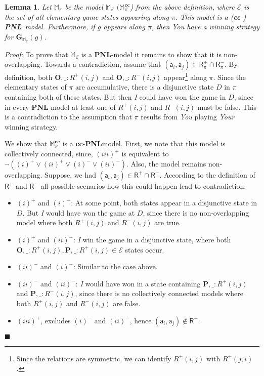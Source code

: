 \documentclass{easychair}
\newcommand{\I}{\emph{I}\xspace}
\newcommand{\You}{\emph{You}\xspace}
\newcommand{\Your}{\emph{Your}\xspace}
\newcommand{\M}{\mathbb{M}}
\newcommand{\R}{\mathsf{R}}
\newcommand{\ag}{\mathsf{a}}
\renewcommand{\qed}{\hfill$\blacksquare$}
\newtheorem{lemma}{Lemma}
\renewenvironment{proof}{\noindent\textit{Proof:}\quad}{\qed}
\newcommand{\PNL}{\textbf{PNL}}
\newcommand{\cc}{\textbf{cc}}
\begin{document}
\begin{lemma}\label{lemmamodel}
Let $\M_\pi$ be the model $\M_\mathcal{E}$ $(\M_\mathcal{E}^\cc$) from the above definition, where $\mathcal{E}$ is the set of all elementary game states appearing along $\pi$. This model is a (\cc-) \PNL~model. Furthermore, if $g$ appears along $\pi$, then \You have a winning strategy for $\mathbf{G}_{\M_\pi}(g)$.
\end{lemma}

\begin{proof}
To prove that $\M_\mathcal{E}$ is a \PNL-model it remains to show that it is non-overlapping. Towards a contradiction, assume that $(\ag_i,\ag_j)\in \R_\pi^+\cap \R_\pi^-$. By definition, both $\mathbf{O},\_:R^+(i,j)$ and $\mathbf{O},\_:R^-(i,j)$ appear\footnote{Since the relations are symmetric, we can identify $R^\pm(i,j)$ with $R^\pm(j,i)$.} along $\pi$. Since the elementary states of $\pi$
are accumulative, there is a disjunctive state $D$ in $\pi$ containing both of these states. But then \I could have won the game in $D$, since in every \PNL-model at least one of $R^+(i,j)$ and $R^-(i,j)$ must be false. This is a contradiction to the assumption that $\pi$ results from \You playing \Your winning strategy.

We show that $\M_\mathcal{E}^\cc$ is a \cc-\PNL model. First, we note that this model is collectively connected, since, $(iii)^+$ is equivalent to $\neg((i)^+\vee (ii)^+\vee (i)^-\vee (ii)^-)$. Also, the model remains non-overlapping. Suppose, we had $(\ag_i,\ag_j)\in \R^+\cap \R^-$.  According to the definition of $\R^+$ and $\R^-$ all possible scenarios how this could happen lead to contradiction:

\begin{itemize}
    \item   $(i)^+$ and $(i)^-$: At some point, both states appear in a disjunctive state in $D$. But \I would have won the game at $D$, since there is no non-overlapping model where both $R^+(i,j)$ and $R^-(i,j)$ are true.
    \item $(i)^+$ and $(ii)^-$: \I win the game in a disjunctive state, where both $\mathbf{O},\_:R^+(i,j),\mathbf{P},\_:R^+(i,j)\in \mathcal{E}$ states occur.
    \item $(ii)^-$ and $(i)^-$: Similar to the case above.
    \item $(ii)^-$ and $(ii)^-$: \I would have won in a state containing $\mathbf{P},\_:R^+(i,j)$ and $\mathbf{P},\_:R^-(i,j)$, since there is no collectively connected models where both $R^+(i,j)$ and $R^-(i,j)$ are false.
    \item $(iii)^+$, excludes $(i)^-$ and $(ii)^-$, hence $(\ag_i,\ag_j)\notin \R^-$.
\end{itemize}


\end{proof}
\end{document}
